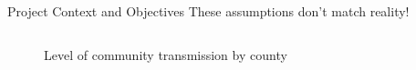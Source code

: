 \begin{slide}{Project Context and Objectives}
	These assumptions don't match reality!
	\begin{columns}[T]
		\begin{column}{.5\textwidth}
			\begin{figure}
				\centering
				Level of community transmission by county \\
				 \\
			\end{figure}
		\end{column}

\end{columns}
\end{slide}
